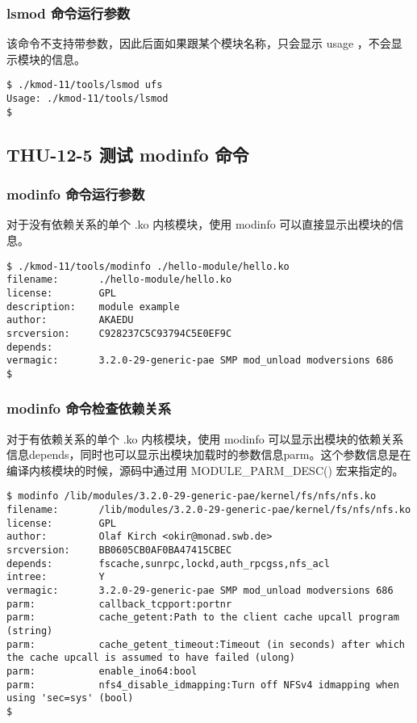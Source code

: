 \documentclass[11pt,a4paper]{article}
\begin{document}
\subsubsection{lsmod 命令运行参数}

该命令不支持带参数，因此后面如果跟某个模块名称，只会显示 usage
，不会显示模块的信息。

{\begin{shaded}\begin{verbatim}
$ ./kmod-11/tools/lsmod ufs
Usage: ./kmod-11/tools/lsmod
$
\end{verbatim}\end{shaded}}
\subsection{THU-12-5 测试 modinfo 命令}

\subsubsection{modinfo 命令运行参数}

对于没有依赖关系的单个 .ko 内核模块，使用 modinfo
可以直接显示出模块的信息。

{\begin{shaded}\begin{verbatim}
$ ./kmod-11/tools/modinfo ./hello-module/hello.ko 
filename:       ./hello-module/hello.ko
license:        GPL
description:    module example 
author:         AKAEDU
srcversion:     C928237C5C93794C5E0EF9C
depends:        
vermagic:       3.2.0-29-generic-pae SMP mod_unload modversions 686 
$ 
\end{verbatim}\end{shaded}}
\subsubsection{modinfo 命令检查依赖关系}

对于有依赖关系的单个 .ko 内核模块，使用 modinfo
可以显示出模块的依赖关系信息depends，同时也可以显示出模块加载时的参数信息parm。这个参数信息是在编译内核模块的时候，源码中通过用
MODULE\_PARM\_DESC() 宏来指定的。

{\begin{shaded}\begin{verbatim}
$ modinfo /lib/modules/3.2.0-29-generic-pae/kernel/fs/nfs/nfs.ko 
filename:       /lib/modules/3.2.0-29-generic-pae/kernel/fs/nfs/nfs.ko
license:        GPL
author:         Olaf Kirch <okir@monad.swb.de>
srcversion:     BB0605CB0AF0BA47415CBEC
depends:        fscache,sunrpc,lockd,auth_rpcgss,nfs_acl
intree:         Y
vermagic:       3.2.0-29-generic-pae SMP mod_unload modversions 686 
parm:           callback_tcpport:portnr
parm:           cache_getent:Path to the client cache upcall program (string)
parm:           cache_getent_timeout:Timeout (in seconds) after which the cache upcall is assumed to have failed (ulong)
parm:           enable_ino64:bool
parm:           nfs4_disable_idmapping:Turn off NFSv4 idmapping when using 'sec=sys' (bool)
$ 
\end{verbatim}\end{shaded}}
\end{document}
